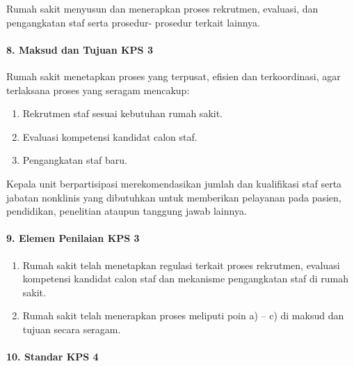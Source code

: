 \documentclass[
]{book}
\providecommand{\tightlist}{%
  \setlength{\itemsep}{0pt}\setlength{\parskip}{0pt}}
\begin{document}
Rumah sakit menyusun dan menerapkan proses rekrutmen, evaluasi, dan pengangkatan staf serta prosedur- prosedur terkait lainnya.

\hypertarget{maksud-dan-tujuan-kps-3}{%
\paragraph*{8. Maksud dan Tujuan KPS 3}\label{maksud-dan-tujuan-kps-3}}

Rumah sakit menetapkan proses yang terpusat, efisien dan terkoordinasi, agar terlaksana proses yang seragam mencakup:

\begin{enumerate}
\def\labelenumi{\alph{enumi}.}
\tightlist
\item
  Rekrutmen staf sesuai kebutuhan rumah sakit.
\item
  Evaluasi kompetensi kandidat calon staf.
\item
  Pengangkatan staf baru.
\end{enumerate}

Kepala unit berpartisipasi merekomendasikan jumlah dan kualifikasi staf serta jabatan nonklinis yang dibutuhkan untuk memberikan pelayanan pada pasien, pendidikan, penelitian ataupun tanggung jawab lainnya.

\hypertarget{elemen-penilaian-kps-3}{%
\paragraph*{9. Elemen Penilaian KPS 3}\label{elemen-penilaian-kps-3}}

\begin{enumerate}
\def\labelenumi{\alph{enumi}.}
\tightlist
\item
  Rumah sakit telah menetapkan regulasi terkait proses rekrutmen, evaluasi kompetensi kandidat calon staf dan mekanisme pengangkatan staf di rumah sakit.
\item
  Rumah sakit telah menerapkan proses meliputi poin a) -- c) di maksud dan tujuan secara seragam.
\end{enumerate}

\hypertarget{standar-kps-4}{%
\paragraph*{10. Standar KPS 4}\label{standar-kps-4}}
\end{document}
